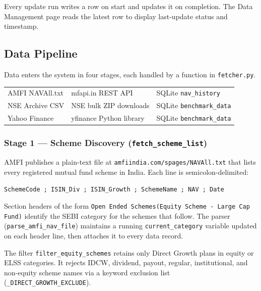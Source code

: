 \documentclass[12pt, a4paper]{article}
\begin{document}
Every update run writes a row on start and updates it on completion.  The
Data Management page reads the latest row to display last-update status and
timestamp.

\subsection{Data Pipeline}

Data enters the system in four stages, each handled by a function in
\texttt{fetcher.py}.

\begin{center}
\begin{tabular}{@{}l@{\;$\longrightarrow$\;}l@{\;$\longrightarrow$\;}l@{}}
AMFI NAVAll.txt & mfapi.in REST API & SQLite \texttt{nav\_history} \\
NSE Archive CSV & NSE bulk ZIP downloads & SQLite \texttt{benchmark\_data} \\
Yahoo Finance & yfinance Python library & SQLite \texttt{benchmark\_data} \\
\end{tabular}
\end{center}

\subsubsection{Stage 1 — Scheme Discovery (\texttt{fetch\_scheme\_list})}

AMFI publishes a plain-text file at
\texttt{amfiindia.com/spages/NAVAll.txt} that lists every registered mutual
fund scheme in India.  Each line is semicolon-delimited:

\begin{center}
\texttt{SchemeCode ; ISIN\_Div ; ISIN\_Growth ; SchemeName ; NAV ; Date}
\end{center}

Section headers of the form \texttt{Open Ended Schemes(Equity Scheme - Large
Cap Fund)} identify the SEBI category for the schemes that follow.
The parser (\texttt{parse\_amfi\_nav\_file}) maintains a running
\texttt{current\_category} variable updated on each header line, then attaches
it to every data record.

The filter \texttt{filter\_equity\_schemes} retains only Direct Growth plans
in equity or ELSS categories.  It rejects IDCW, dividend, payout, regular,
institutional, and non-equity scheme names via a keyword exclusion list
(\texttt{\_DIRECT\_GROWTH\_EXCLUDE}).
\end{document}
